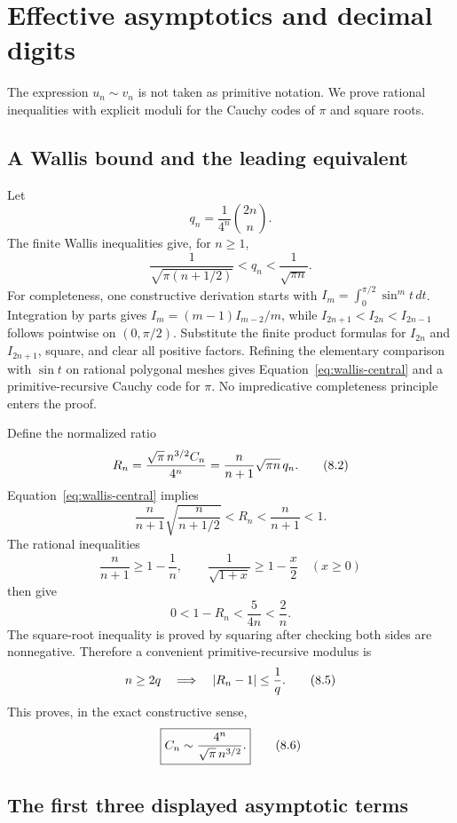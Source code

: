 \section{Effective asymptotics and decimal digits}
\label{sec:asymptotics}

The expression $u_n\sim v_n$ is not taken as primitive notation.  We prove
rational inequalities with explicit moduli for the Cauchy codes of $\pi$ and
square roots.

\subsection{A Wallis bound and the leading equivalent}

Let
\[
 q_n=\frac1{4^n}\binom{2n}{n}.
\]
The finite Wallis inequalities give, for $n\ge1$,
\[
 \frac1{\sqrt{\pi(n+1/2)}}<q_n<\frac1{\sqrt{\pi n}}.             \tag{8.1}\label{eq:wallis-central}
\]
For completeness, one constructive derivation starts with
$I_m=\int_0^{\pi/2}\sin^m t\,dt$.  Integration by parts gives
$I_m=(m-1)I_{m-2}/m$, while
$I_{2n+1}<I_{2n}<I_{2n-1}$ follows pointwise on $(0,\pi/2)$.  Substitute the
finite product formulas for $I_{2n}$ and $I_{2n+1}$, square, and clear all
positive factors.  Refining the elementary comparison with
$\sin t$ on rational polygonal meshes gives Equation~\eqref{eq:wallis-central}
and a primitive-recursive Cauchy code for $\pi$.  No impredicative completeness
principle enters the proof.

Define the normalized ratio
\[
 R_n=\frac{\sqrt\pi\,n^{3/2}C_n}{4^n}
     =\frac n{n+1}\sqrt{\pi n}\,q_n.                            \tag{8.2}
\]
Equation~\eqref{eq:wallis-central} implies
\[
 \frac n{n+1}\sqrt{\frac n{n+1/2}}<R_n<\frac n{n+1}<1.          \tag{8.3}\label{eq:Rbounds}
\]
The rational inequalities
\[
 \frac n{n+1}\ge1-\frac1n,
 \qquad
 \frac1{\sqrt{1+x}}\ge1-\frac x2\quad(x\ge0)
\]
then give
\[
 0<1-R_n<\frac{5}{4n}<\frac2n.                                  \tag{8.4}\label{eq:leading-error}
\]
The square-root inequality is proved by squaring after checking both sides are
nonnegative.  Therefore a convenient primitive-recursive modulus is
\[
 n\ge2q\quad\Longrightarrow\quad \left|R_n-1\right|\le\frac1q.         \tag{8.5}\label{eq:leading-modulus}
\]
This proves, in the exact constructive sense,
\[
 \boxed{\displaystyle
 C_n\sim\frac{4^n}{\sqrt\pi\,n^{3/2}}.}                       \tag{8.6}
\]

\subsection{The first three displayed asymptotic terms}

